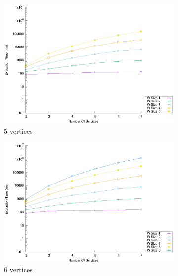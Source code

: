 \begin{figure}[!htb]
\begin{subfigure}{0.33\textwidth}
    \includegraphics[width=\textwidth]{Images/graphs/window_time_performance_n7_s7_50_89_n5}
    \caption{5 vertices}
    \label{fig:time_window_perce_wide_5n}
  \end{subfigure}
  \hfill
  \begin{subfigure}{0.33\textwidth}
    \includegraphics[width=\textwidth]{Images/graphs/window_time_performance_n7_s7_50_89_n6}
    \caption{6 vertices}
    \label{fig:time_window_perce_wide_6n}
  \end{subfigure}
  \begin{subfigure}{0.33\textwidth}

\end{subfigure}
\end{figure}
